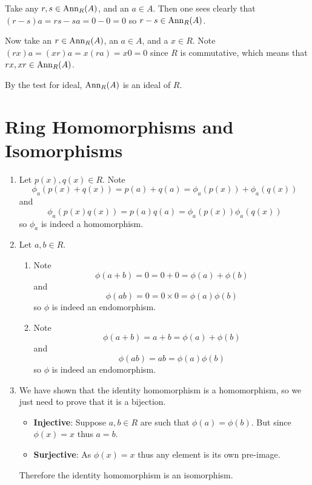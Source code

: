 \begin{enumerate}
    Take any $r, s \in \mathrm{Ann}_{R}(A)$, and an $a \in A$. Then one sees clearly that $(r-s)a = rs - sa = 0 - 0 = 0$ so $r-s \in \mathrm{Ann}_{R}(A)$.

    Now take an $r \in \mathrm{Ann}_{R}(A)$, an $a \in A$, and a $x \in R$. Note $(rx)a = (xr)a = x(ra) = x0 = 0$ since $R$ is commutative, which means that $rx, xr \in \mathrm{Ann}_{R}(A)$.

    By the test for ideal, $\mathrm{Ann}_{R}(A)$ is an ideal of $R$.
\end{enumerate}

\section{Ring Homomorphisms and Isomorphisms}
\begin{enumerate}
    \item Let $p(x), q(x) \in R$. Note
    \[
        \phi_a(p(x)+q(x)) = p(a) + q(a) = \phi_a(p(x)) + \phi_a(q(x))
    \]
    and
    \[
        \phi_a(p(x)q(x)) = p(a)q(a) = \phi_a(p(x))\phi_a(q(x))
    \]
    so $\phi_a$ is indeed a homomorphism.

    \item Let $a, b \in R$.
    \begin{enumerate}[label=(\alph*)]
        \item Note
        \[
            \phi(a+b) = 0 = 0 + 0 = \phi(a) + \phi(b)
        \]
        and
        \[
            \phi(ab) = 0 = 0\times0 = \phi(a)\phi(b)
        \]
        so $\phi$ is indeed an endomorphism.

        \item Note
        \[
            \phi(a+b) = a + b = \phi(a) + \phi(b)
        \]
        and
        \[
            \phi(ab) = ab = \phi(a)\phi(b)
        \]
        so $\phi$ is indeed an endomorphism.
    \end{enumerate}

    \item We have shown that the identity homomorphism is a homomorphism, so we just need to prove that it is a bijection.
    \begin{itemize}
        \item \textbf{Injective}: Suppose $a, b \in R$ are such that $\phi(a) = \phi(b)$. But since $\phi(x) = x$ thus $a = b$.
        \item \textbf{Surjective}: As $\phi(x) = x$ thus any element is its own pre-image.
    \end{itemize}
    Therefore the identity homomorphism is an isomorphism.


\end{enumerate}
